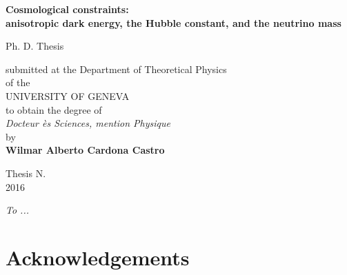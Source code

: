 \documentclass[12pt]{report}
\date{}
\renewcommand{\(}{\left(}
\renewcommand{\)}{\right)}
\renewcommand{\[}{\left[}
\renewcommand{\]}{\right]}
\begin{document}
\renewcommand{\figurename}{\textbf{Fig.}}
\renewcommand{\tablename}{\textbf{Tab.}}

\thispagestyle{empty}
\begin{center}  

\Large  \textbf{Cosmological constraints: \\
anisotropic dark energy, the Hubble constant, and the neutrino mass} \\
  
\vspace{3.5cm}  

\large Ph. D. Thesis

\vspace{3.5cm}

submitted at the Department of Theoretical Physics \\

of the \\

UNIVERSITY OF GENEVA\\

to obtain the degree of \\

\textit{Docteur ès Sciences, mention Physique}\\

by\\

\large \textbf{Wilmar Alberto Cardona Castro}\\  

\vspace{3.5cm} 

\large Thesis N. \\  
\normalsize 2016  

\end{center}  

\newpage  
{}
  
  
\vspace{6cm}  
\begin{center}

\large \textit{To ...}
\normalsize

\end{center}
  
\newpage  

\chapter*{Acknowledgements} 

\vspace{3mm}
\end{document}
